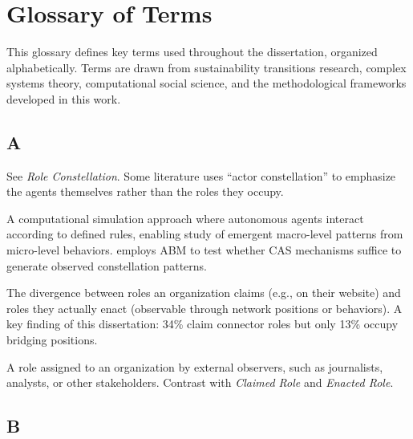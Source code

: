 \documentclass[../main.tex]{subfiles}
\begin{document}

\chapter{Glossary of Terms}

This glossary defines key terms used throughout the dissertation, organized alphabetically. Terms are drawn from sustainability transitions research, complex systems theory, computational social science, and the methodological frameworks developed in this work.

\section*{A}

\begin{description}[leftmargin=0.5cm, style=nextline]

\item[Actor Constellation] See \textit{Role Constellation}. Some literature uses ``actor constellation'' to emphasize the agents themselves rather than the roles they occupy.

\item[Agent-Based Model (ABM)] A computational simulation approach where autonomous agents interact according to defined rules, enabling study of emergent macro-level patterns from micro-level behaviors. \RoleSim{} employs ABM to test whether CAS mechanisms suffice to generate observed constellation patterns.

\item[Aspiration Gap] The divergence between roles an organization claims (e.g., on their website) and roles they actually enact (observable through network positions or behaviors). A key finding of this dissertation: 34\% claim connector roles but only 13\% occupy bridging positions.

\item[Attributed Role] A role assigned to an organization by external observers, such as journalists, analysts, or other stakeholders. Contrast with \textit{Claimed Role} and \textit{Enacted Role}.

\end{description}

\section*{B}
\end{document}
